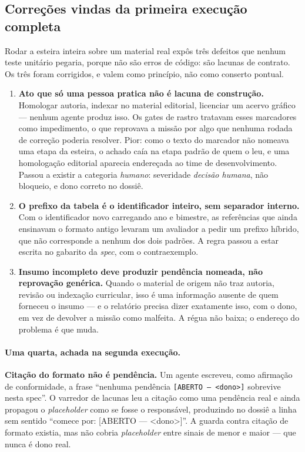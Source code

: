 \documentclass[11pt,a4paper]{article}
\newcommand{\cod}[1]{\texttt{\small #1}}
\begin{document}
\subsection{Correções vindas da primeira execução completa}

Rodar a esteira inteira sobre um material real expôs três defeitos que nenhum teste unitário pegaria,
porque não são erros de código: são lacunas de contrato. Os três foram corrigidos, e valem como
princípio, não como conserto pontual.

\begin{enumerate}[leftmargin=*,itemsep=4pt]
  \item \textbf{Ato que só uma pessoa pratica não é lacuna de construção.} Homologar autoria,
  indexar no material editorial, licenciar um acervo gráfico --- nenhum agente produz isso. Os
  gates de rastro tratavam esses marcadores como impedimento, o que reprovava a missão por algo que
  nenhuma rodada de correção poderia resolver. Pior: como o texto do marcador não nomeava uma etapa
  da esteira, o achado caía na etapa padrão de quem o leu, e uma homologação editorial aparecia
  endereçada ao time de desenvolvimento. Passou a existir a categoria \emph{humano}: severidade
  \emph{decisão humana}, não bloqueio, e dono correto no dossiê.

  \item \textbf{O prefixo da tabela é o identificador inteiro, sem separador interno.} Com o
  identificador novo carregando ano e bimestre, as referências que ainda ensinavam o formato antigo
  levaram um avaliador a pedir um prefixo híbrido, que não corresponde a nenhum dos dois padrões. A
  regra passou a estar escrita no gabarito da \emph{spec}, com o contraexemplo.

  \item \textbf{Insumo incompleto deve produzir pendência nomeada, não reprovação genérica.} Quando
  o material de origem não traz autoria, revisão ou indexação curricular, isso é uma informação
  ausente de quem forneceu o insumo --- e o relatório precisa dizer exatamente isso, com o dono, em
  vez de devolver a missão como malfeita. A régua não baixa; o endereço do problema é que muda.
\end{enumerate}

\paragraph{Uma quarta, achada na segunda execução.} \textbf{Citação do formato não é pendência.}
Um agente escreveu, como afirmação de conformidade, a frase ``nenhuma pendência
\cod{[ABERTO --- <dono>]} sobrevive nesta spec''. O varredor de lacunas leu a citação como uma
pendência real e ainda propagou o \emph{placeholder} como se fosse o responsável, produzindo no
dossiê a linha sem sentido ``comece por: [ABERTO --- <dono>]''. A guarda contra citação de formato
existia, mas não cobria \emph{placeholder} entre sinais de menor e maior --- que nunca é dono real.
\end{document}
